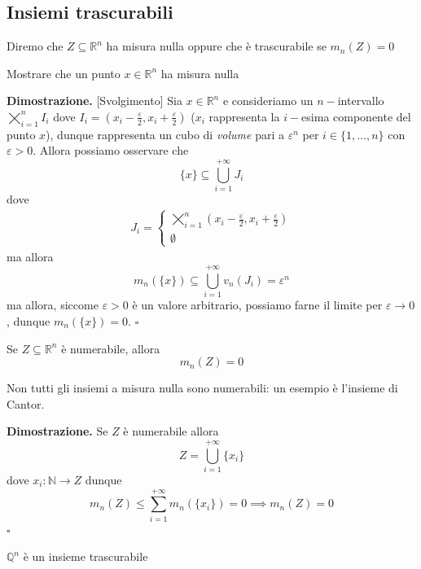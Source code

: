 \subsection{Insiemi trascurabili}
\begin{definition}
	Diremo che $Z \subseteq \mathbb{R}^n$ ha misura nulla oppure che è trascurabile se $m_n(Z) = 0$
\end{definition}
%
\vspace{0.5cm}
\begin{exercise}
	Mostrare che un punto $x \in \mathbb{R}^n$ ha misura nulla
\end{exercise}
%
\noindent \textbf{Dimostrazione. }[Svolgimento]
	Sia $x \in \mathbb{R}^n$ e consideriamo un $n-$intervallo $\varprod\limits_{i=1}^n I_i$ dove $I_i = (x_i - \frac{\varepsilon}{2}, x_i + \frac{\varepsilon}{2})$ ($x_i$ rappresenta la $i-$esima componente del punto $x$), dunque rappresenta un cubo di \emph{volume} pari a $\varepsilon^n$ per $i \in \{1, \ldots, n \}$ con $\varepsilon > 0$. Allora possiamo osservare che
	$$
	\{ x \} \subseteq \bigcup_{i=1}^{+\infty} J_i
	$$
	dove
	\[\begin{aligned}
		J_i = \begin{cases}
			\varprod_{i=1}^n (x_i - \frac{\varepsilon}{2}, x_i + \frac{\varepsilon}{2}) \\
			\emptyset
		\end{cases}
	\end{aligned}\]
	ma allora
	$$
	m_n(\{ x \}) \subseteq \bigcup_{i=1}^{+\infty} v_n(J_i) = \varepsilon^n
	$$
	ma allora, siccome $\varepsilon > 0$ è un valore arbitrario, possiamo farne il limite per $\varepsilon \to 0$, dunque $m_n(\{ x \}) = 0$.
\hfill $\square$
%
\vspace{0.5cm}
\begin{prop}
	Se $Z \subseteq \mathbb{R}^n$ è numerabile, allora
	$$
		m_n(Z) = 0
	$$
\end{prop}
%
\begin{remark}
	Non tutti gli insiemi a misura nulla sono numerabili: un esempio è l'insieme di Cantor.
\end{remark}
%
\noindent \textbf{Dimostrazione. }
	Se $Z$ è numerabile allora
	$$
		Z = \bigcup_{i=1}^{+\infty} \{ x_i \}
	$$
	dove $x_i: \mathbb{N} \to Z$ dunque
	$$
	m_n(Z) \leq \sum_{i=1}^{+\infty} m_n(\{ x_i \}) = 0 \implies m_n(Z) = 0
	$$
\hfill $\square$
%
\vspace{0.5cm}
\begin{cor}
	$\mathbb{Q}^n$ è un insieme trascurabile
\end{cor}
